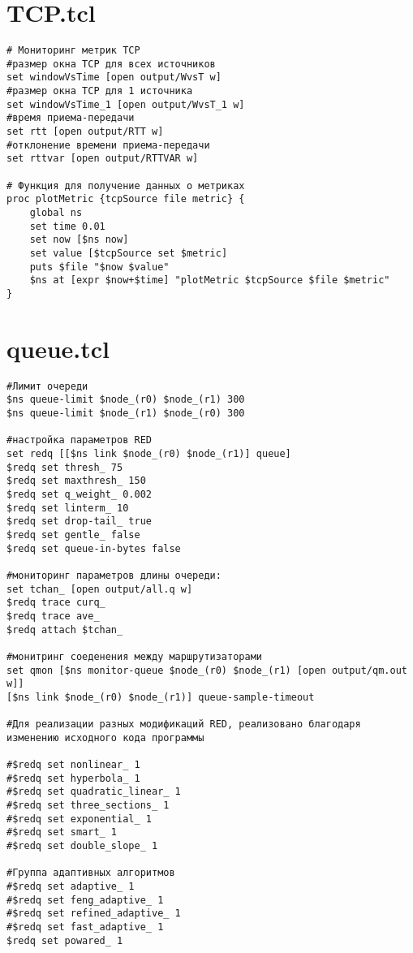 \section*{TCP.tcl}
\label{app1:sec3}
\begin{verbatim}
# Мониторинг метрик TCP
#размер окна TCP для всех источников
set windowVsTime [open output/WvsT w]
#размер окна TCP для 1 источника 
set windowVsTime_1 [open output/WvsT_1 w]
#время приема-передачи
set rtt [open output/RTT w]
#отклонение времени приема-передачи 
set rttvar [open output/RTTVAR w]

# Функция для получение данных о метриках
proc plotMetric {tcpSource file metric} {
    global ns
    set time 0.01
    set now [$ns now]
    set value [$tcpSource set $metric]
    puts $file "$now $value"
    $ns at [expr $now+$time] "plotMetric $tcpSource $file $metric"
}
\end{verbatim}

\section*{queue.tcl}
\label{app1:sec4}
\begin{verbatim}
#Лимит очереди
$ns queue-limit $node_(r0) $node_(r1) 300
$ns queue-limit $node_(r1) $node_(r0) 300

#настройка параметров RED
set redq [[$ns link $node_(r0) $node_(r1)] queue]
$redq set thresh_ 75 
$redq set maxthresh_ 150
$redq set q_weight_ 0.002
$redq set linterm_ 10
$redq set drop-tail_ true
$redq set gentle_ false
$redq set queue-in-bytes false

#мониторинг параметров длины очереди:
set tchan_ [open output/all.q w]
$redq trace curq_
$redq trace ave_
$redq attach $tchan_

#монитринг соеденения между маршрутизаторами
set qmon [$ns monitor-queue $node_(r0) $node_(r1) [open output/qm.out w]] 
[$ns link $node_(r0) $node_(r1)] queue-sample-timeout

#Для реализации разных модификаций RED, реализовано благодаря изменению исходного кода программы

#$redq set nonlinear_ 1
#$redq set hyperbola_ 1 
#$redq set quadratic_linear_ 1
#$redq set three_sections_ 1
#$redq set exponential_ 1
#$redq set smart_ 1
#$redq set double_slope_ 1

#Группа адаптивных алгоритмов
#$redq set adaptive_ 1
#$redq set feng_adaptive_ 1
#$redq set refined_adaptive_ 1
#$redq set fast_adaptive_ 1
$redq set powared_ 1
\end{verbatim}

